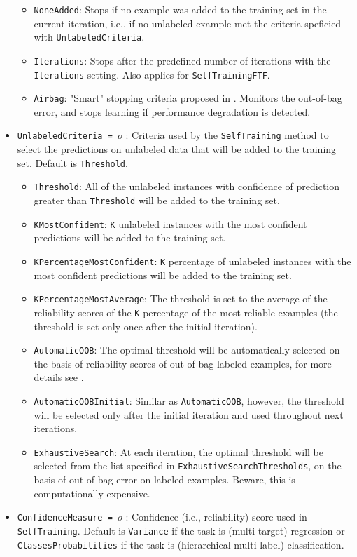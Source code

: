 \documentclass[a4paper]{report}
\begin{document}
\begin{itemize}
\begin{itemize}
\item {\tt NoneAdded}: Stops if no example was added to the training set in the current iteration, i.e., if no unlabeled example met the criteria speficied with {\tt UnlabeledCriteria}. 
\item {\tt Iterations}: Stops after the predefined number of iterations with the {\tt Iterations} setting. Also applies for {\tt SelfTrainingFTF}.
\item {\tt Airbag}: "Smart" stopping criteria proposed in \cite{leistner2009semi}. Monitors the out-of-bag error, and stops learning if performance degradation is detected. 
\end{itemize}
\item {\tt UnlabeledCriteria = $o$} : Criteria used by the {\tt SelfTraining} method to select the predictions on unlabeled data that will be added to the training set. Default is {\tt Threshold}.
\begin{itemize}
\item {\tt Threshold}: All of the unlabeled instances with confidence of prediction greater than {\tt Threshold} will be added to the training set.
\item {\tt KMostConfident}: {\tt K} unlabeled instances with the most confident predictions will be added to the training set.
\item {\tt KPercentageMostConfident}: {\tt K} percentage of unlabeled instances with the most confident predictions will be added to the training set.
\item {\tt KPercentageMostAverage}: The threshold is set to the average of the reliability scores of the {\tt K} percentage of the most reliable examples (the threshold is set only once after the initial iteration).
\item {\tt AutomaticOOB}: The optimal threshold will be automatically selected on the basis of reliability scores of out-of-bag labeled examples, for more details see \cite{levatic2017_self-training}.
\item {\tt AutomaticOOBInitial}: Similar as {\tt AutomaticOOB}, however, the threshold will be selected only after the initial iteration and used throughout next iterations.
\item {\tt ExhaustiveSearch}: At each iteration, the optimal threshold will be selected from the list specified in {\tt ExhaustiveSearchThresholds}, on the basis of out-of-bag error on labeled examples. Beware, this is computationally expensive. 
\end{itemize}
\item {\tt ConfidenceMeasure = $o$} : Confidence (i.e., reliability) score used in {\tt SelfTraining}. Default is {\tt Variance} if the task is (multi-target) regression or {\tt ClassesProbabilities} if the task is (hierarchical multi-label) classification.

\end{itemize}
\end{document}

